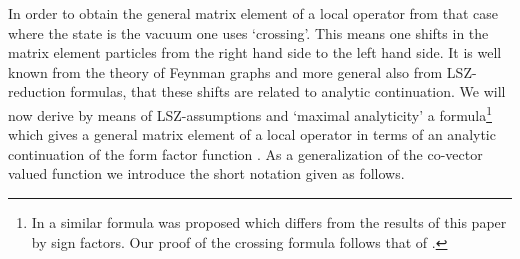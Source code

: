 \documentclass[a4paper,a4paper]{article}
\begin{document}
In order to obtain the general matrix element \coordHE{} of a local operator
from that case where the state \myHighlight{$\phi ^{\prime }$}\coordHE{} is the vacuum one uses
`crossing'. This means one shifts in the matrix element particles from the
right hand side to the left hand side. It is well known from the theory of
Feynman graphs and more general also from LSZ-reduction formulas, that these
shifts are related to analytic continuation. We will now derive by means of
LSZ-assumptions and `maximal analyticity' a formula\footnote{%
In \cite{Sm} a similar formula was proposed which differs from the results
of this paper by sign factors. Our proof of the crossing formula follows
that of \cite{Q}.} which gives a general matrix element of a local operator \coordHE{} in terms of an analytic continuation of the form factor
function \coordHE{}. As a generalization
of the co-vector valued function \coordHE{} we introduce the short notation \coordHE{} given as follows.
\end{document}
